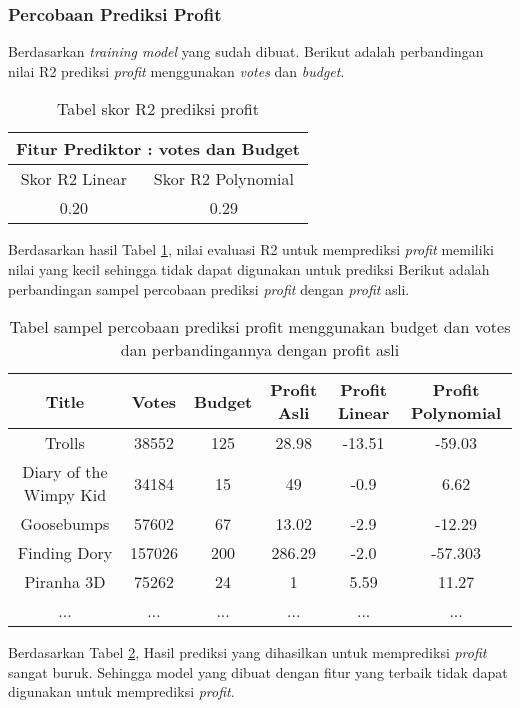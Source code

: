 \subsubsection{Percobaan Prediksi Profit}
Berdasarkan \textit{training model} yang sudah dibuat. Berikut adalah perbandingan nilai R2 prediksi \textit{profit} menggunakan \textit{votes} dan \textit{budget}. 


\begin{table}[H]
\caption{Tabel skor R2 prediksi profit}
\centering
\begin{tabular}{|c|c|}
\hline 
\multicolumn{2}{|c|}{Fitur Prediktor : votes dan Budget} \\ 
\hline 
Skor R2 Linear & Skor R2 Polynomial \\ 
\hline 
0.20 & 0.29 \\ 
\hline 
\end{tabular} 

\label{tab:tabelr2_profit}
\end{table}

Berdasarkan hasil Tabel \ref{tab:tabelr2_profit}, nilai evaluasi R2 untuk memprediksi \textit{profit} memiliki nilai yang kecil sehingga tidak dapat digunakan untuk prediksi Berikut adalah perbandingan sampel percobaan prediksi \textit{profit} dengan \textit{profit} asli. 

\begin{table}[H]
\caption{Tabel sampel percobaan prediksi profit menggunakan budget dan votes dan perbandingannya dengan profit asli}
\centering
\begin{tabular}{|c|c|c|c|c|c|}
\hline 
Title & Votes & Budget & Profit Asli & Profit Linear  & Profit Polynomial \\ 
\hline 
Trolls & 38552 & 125 & 28.98 & -13.51 & -59.03 \\ 
\hline 
Diary of the Wimpy Kid & 34184 & 15 & 49 & -0.9 & 6.62 \\ 
\hline 
Goosebumps & 57602 & 67 & 13.02 & -2.9 & -12.29 \\ 
\hline 
Finding Dory & 157026 & 200 & 286.29 & -2.0 & -57.303 \\ 
\hline 
Piranha 3D & 75262 & 24 & 1 & 5.59 & 11.27 \\ 
\hline 
... & ... & ... & ... & ... & ... \\ 
\hline 
\end{tabular} 
\label{tab:5sampelprediksi_profititerasi2}
\end{table}

Berdasarkan Tabel \ref{tab:5sampelprediksi_profititerasi2}, Hasil prediksi yang dihasilkan untuk memprediksi \textit{profit} sangat buruk. Sehingga model yang dibuat dengan fitur yang terbaik tidak dapat digunakan untuk memprediksi \textit{profit}. 


